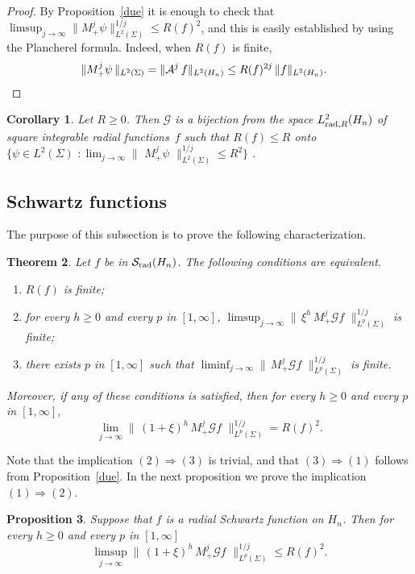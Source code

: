 \documentclass[12pt,a4paper]{amsart}
\theoremstyle{plain}
\newtheorem{theorem}{Theorem}[section]
\newtheorem{corollary}[theorem]{Corollary}
\newtheorem{proposition}[theorem]{Proposition}
\theoremstyle{definition}
\numberwithin{equation}{section}
\begin{document}
\begin{proof} By Proposition~\ref{due}
it is enough to check that 
$\limsup_{j\to\infty} \|M_+^j\psi\|_{L^{2}({\Sigma})}^{1/ j}\leq R(f)^2$,
and this is easily established by using the Plancherel formula. Indeed,
when $R(f)$ is finite,
\begin{align*}
\|M_+^j\psi \,\|_{L^{2}({\Sigma})}
&= \|{\mathcal A}^j\,f\|_{L^{2}({{H_{n}}})}
\leq   R(f)^{2j} \, \|f\|_{L^{2}({{H_{n}}})}.
\qedhere
\end{align*}
\end{proof}

\begin{corollary}\label{L2}
Let $R\geq 0$. Then  
${\mathcal G}$
is a bijection from the space $L^2_{\text{\rm rad},R}({{H_{n}}})$ 
of square integrable radial functions~$f$ such that $R(f)\leq R$
onto $\{\psi\in L^2({\Sigma})
\,\,: 
\lim_{j\to\infty} 
\|\,\,M_+^j \psi\,\,\|_{L^2({\Sigma})}^{1/j}
\leq R^2
\}$
.
\end{corollary}

\subsection{Schwartz functions}
 
The purpose of this subsection is to prove the following characterization.

\begin{theorem}\label{sch}
Let $f$ be in ${{\mathcal S}_{\text{\rm rad}}({{H_{n}}})}$. The following conditions are equivalent.
\begin{enumerate}

\item  $R(f)$ is finite;

\item  for every $h\geq 0$ and every $p$ in $[1,\infty]$,
 $\limsup_{j\to\infty} 
\|\,\xi^h\,M_+^j{\mathcal G} f\,\,\|_{L^p({\Sigma})}^{1/j}
$ is finite;

\item  there exists  $p$ in $[1,\infty]$ such that
 $\liminf_{j\to\infty} 
\|\,M_+^j{\mathcal G} f\,\,\|_{L^p({\Sigma})}^{1/j}
$ is finite.

\end{enumerate}
Moreover, if any of these conditions is satisfied, then for every $h\geq 0$ and every $p$ in $[1,\infty]$,
$$
\lim_{j\to\infty} 
\|\,(1+\xi)^h\,M_+^j{\mathcal G} f\,\,\|_{L^p({\Sigma})}^{1/j}
=R(f)^2.
$$
\end{theorem} 

Note that the implication $(2)\Rightarrow (3)$ is trivial,
and that $(3)\Rightarrow (1)$ follows from Proposition~\ref{due}.
In the next proposition we prove the implication $(1)\Rightarrow (2)$.
\begin{proposition} 
\label{uno}
Suppose that $f$ is a radial Schwartz function on ${{H_{n}}}$.
 Then
for every $h\geq 0$ and every $p$ in $[1,\infty]$
$$
\limsup_{j\to\infty} 
\|\,(1+\xi)^h\,M_+^j{\mathcal G} f\,\,\|_{L^p({\Sigma})}^{1/j}
\leq R(f)^2.
$$ 
\end{proposition}
\end{document}
